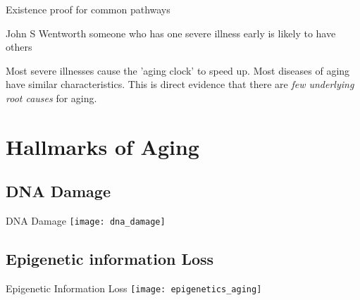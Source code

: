 \begin{frame}[c]{Existence proof for common pathways}
    \large
    \begin{aquote}{John S Wentworth}
        someone who has one severe illness early is likely to have others
    \end{aquote}

    \pause
    Most severe illnesses cause the 'aging clock' to speed up. Most diseases of
    aging have similar characteristics. This is direct evidence that there are
    {\em few underlying root causes} for aging.
\end{frame}


\section{Hallmarks of Aging}



\subsection{DNA Damage}
\begin{frame}[c]{DNA Damage}
    \texttt{[image: dna\_damage]} \\
    \cite{alhmoud2020dna}
\end{frame}

\subsection{Epigenetic information Loss}
\begin{frame}[c]{Epigenetic Information Loss}
    \texttt{[image: epigenetics\_aging]} \\
    \cite{saul2021epigenetics} \\
\end{frame}


